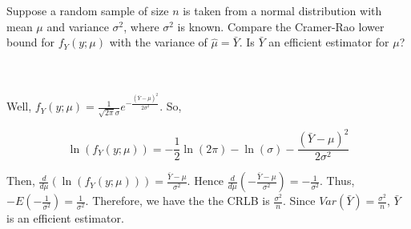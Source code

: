 Suppose a random sample of size $n$ is taken from a normal distribution with mean $\mu$ and variance
$\sigma^2$, where $\sigma^2$ is known. Compare the Cramer-Rao lower bound for $f_Y(y;\mu)$ with the
variance of $\hat{\mu}=\bar{Y}$. Is $\bar{Y}$ an efficient estimator for $\mu$?\\\\

\begin{solution}\renewcommand{\qedsymbol}{}\ \\
    Well, $f_Y(y;\mu)=\frac{1}{\sqrt{2\pi}\sigma}e^{-\frac{(\bar{Y}-\mu)^2}{2\sigma^2}}$.
    So,
    
    $$\ln(f_Y(y;\mu))=-\frac12\ln(2\pi)-\ln(\sigma)-\frac{(\bar{Y}-\mu)^2}{2\sigma^2}$$
    
    Then, $\frac{d}{d\mu}(\ln(f_Y(y;\mu)))=\frac{\bar{Y}-\mu}{\sigma^2}$. Hence
    $\frac{d}{d\mu}(-\frac{\bar{Y}-\mu}{\sigma^2})=-\frac{1}{\sigma^2}$. Thus,
    $-E(-\frac{1}{\sigma^2})=\frac{1}{\sigma^2}$. Therefore, we have the the CRLB is
    $\frac{\sigma^2}{n}$. Since $Var(\bar{Y})=\frac{\sigma^2}{n}$, $\bar{Y}$ is an efficient estimator.

\end{solution}